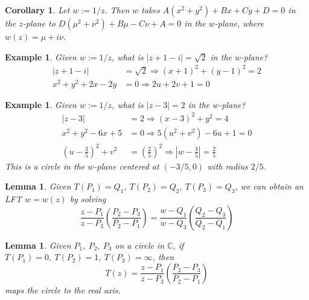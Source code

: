 \documentclass{article}
\newtheorem{lemma}[theorem]{Lemma}
\newtheorem{corollary}[theorem]{Corollary}
\newtheorem{example}[theorem]{Example}
\theoremstyle{definition}
\begin{document}
\begin{corollary} \normalfont
    Let $w := 1/z$. Then $w$ takes $A(x^2 + y^2) + Bx + Cy + D = 0$ in the $z$-plane to $D(\mu^2 +\nu^2) + B\mu - C\nu + A = 0$ in the $w$-plane, where $w(z) = \mu + i\nu$.
\end{corollary}

\begin{example} \normalfont
    Given $w := 1/z$, what is $|z + 1 - i| = \sqrt{2}$ in the $w$-plane?
    \begin{align*}
        |z + 1 - i| &= \sqrt{2} \Longrightarrow (x+1)^2 + (y-1)^2 = 2 \\
        x^2 + y^2 + 2x - 2y &= 0 \Longrightarrow 2u + 2v + 1 = 0
    \end{align*}
\end{example}

\begin{example} \normalfont
    Given $w := 1/z$, what is $|z-3| = 2$ in the $w$-plane?
    \begin{align*}
        |z-3| &= 2 \Longrightarrow (x-3)^2 + y^2 = 4 \\
        x^2 + y^2 - 6x + 5 &= 0 \Longrightarrow 5(u^2 + v^2) - 6u + 1 = 0 \\
        \left( u - \frac{3}{5} \right)^2 + v^2 &= \left( \frac{2}{5} \right)^2 \Longrightarrow \left| w - \frac{3}{5} \right| = \frac{2}{5}
    \end{align*}
    This is a circle in the $w$-plane centered at $(-3/5, 0)$ with radius $2/5$.
\end{example}

\begin{lemma} \normalfont
    Given $T(P_1) = Q_1,\ T(P_2) = Q_2,\ T(P_3) = Q_3$, we can obtain an LFT $w = w(z)$ by solving
    \begin{equation*}
        \frac{z - P_1}{z - P_3} \left( \frac{P_2 - P_3}{P_2 - P_1 }\right) = \frac{w - Q_1}{w - Q_3} \left( \frac{Q_2 - Q_3}{Q_2 - Q_1 }\right)
    \end{equation*}
\end{lemma}

\begin{lemma} \normalfont
    Given $P_1,\ P_2,\ P_3$ on a circle in $\mathbb{C}$, if $T(P_1)=0,\ T(P_2) = 1,\ T(P_3) = \infty$, then
    \begin{equation*}
        T(z) = \frac{z - P_1}{z - P_3} \left( \frac{P_2 - P_3}{P_2 - P_1} \right)
    \end{equation*}
    maps the circle to the real axis.
\end{lemma}
\end{document}
